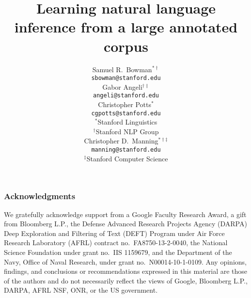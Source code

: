 \documentclass[11pt,a4paper]{article}
\title{Learning natural language inference from a large annotated corpus}
\author{
Samuel R.\ Bowman$^{\ast\dag}$ \\
\texttt{sbowman@stanford.edu} \\
\And
Gabor Angeli$^{\dag\ddag}$ \\
\texttt{angeli@stanford.edu} \\
\AND
Christopher Potts$^{\ast}$\\
\texttt{cgpotts@stanford.edu} \\[2ex]
$^{\ast}$Stanford Linguistics\\
$^{\dag}$Stanford NLP Group\\
\And
Christopher D.\ Manning$^{\ast\dag\ddag}$\\
\texttt{manning@stanford.edu}\\[2ex]
$^{\ddag}$Stanford Computer Science
}
\date{}
\begin{document}
\maketitle





% 



\subsubsection*{Acknowledgments}

%
We gratefully acknowledge support from %
a Google Faculty Research Award, %
a gift from Bloomberg L.P., 
the Defense Advanced Research Projects Agency (DARPA) Deep Exploration and Filtering of Text (DEFT) Program under Air Force Research Laboratory (AFRL) contract no.~FA8750-13-2-0040,
the National Science Foundation under grant no.~IIS 1159679, and %
the Department of the Navy, Office of Naval Research, under grant no.~N00014-10-1-0109.
%
Any opinions, findings, and conclusions or recommendations expressed in this material are those of the authors and do not necessarily reflect the views of 
Google, 
Bloomberg L.P.,
DARPA,
AFRL
NSF, 
ONR, or 
the US government.





 
\end{document}
